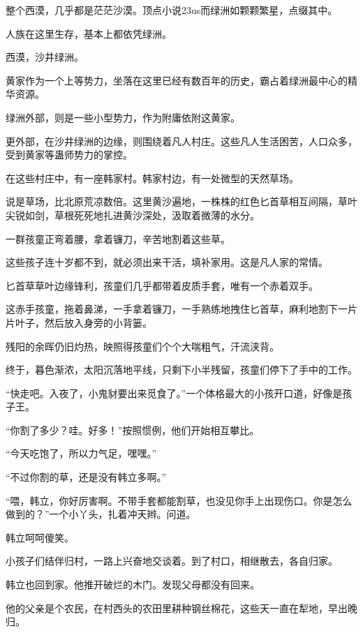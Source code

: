 
\begin{this_body}

整个西漠，几乎都是茫茫沙漠。顶点小说23us而绿洲如颗颗繁星，点缀其中。

人族在这里生存，基本上都依凭绿洲。

西漠，沙井绿洲。

黄家作为一个上等势力，坐落在这里已经有数百年的历史，霸占着绿洲最中心的精华资源。

绿洲外部，则是一些小型势力，作为附庸依附这黄家。

更外部，在沙井绿洲的边缘，则围绕着凡人村庄。这些凡人生活困苦，人口众多，受到黄家等蛊师势力的掌控。

在这些村庄中，有一座韩家村。韩家村边，有一处微型的天然草场。

说是草场，比北原荒凉数倍。这里黄沙遍地，一株株的红色匕首草相互间隔，草叶尖锐如剑，草根死死地扎进黄沙深处，汲取着微薄的水分。

一群孩童正弯着腰，拿着镰刀，辛苦地割着这些草。

这些孩子连十岁都不到，就必须出来干活，填补家用。这是凡人家的常情。

匕首草草叶边缘锋利，孩童们几乎都带着皮质手套，唯有一个赤着双手。

这赤手孩童，拖着鼻涕，一手拿着镰刀，一手熟练地拽住匕首草，麻利地割下一片片叶子，然后放入身旁的小背篓。

残阳的余晖仍旧灼热，映照得孩童们个个大喘粗气，汗流浃背。

终于，暮色渐浓，太阳沉落地平线，只剩下小半残留，孩童们停下了手中的工作。

“快走吧。入夜了，小鬼豺要出来觅食了。”一个体格最大的小孩开口道，好像是孩子王。

“你割了多少？哇。好多！”按照惯例，他们开始相互攀比。

“今天吃饱了，所以力气足，嘿嘿。”

“不过你割的草，还是没有韩立多啊。”

“喂，韩立，你好厉害啊。不带手套都能割草，也没见你手上出现伤口。你是怎么做到的？”一个小丫头，扎着冲天辫。问道。

韩立呵呵傻笑。

小孩子们结伴归村，一路上兴奋地交谈着。到了村口，相继散去，各自归家。

韩立也回到家。他推开破烂的木门。发现父母都没有回来。

他的父亲是个农民，在村西头的农田里耕种钢丝棉花，这些天一直在犁地，早出晚归。


\end{this_body}
